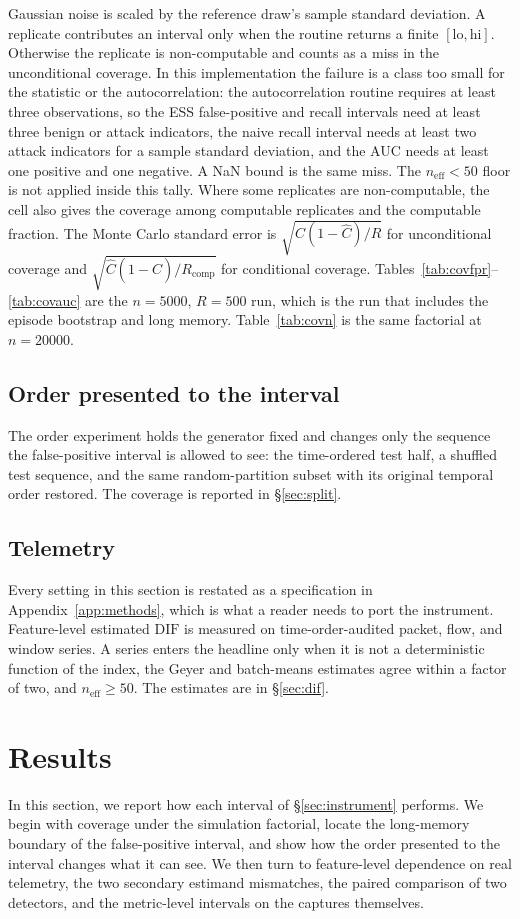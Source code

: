 \documentclass[a4paper,fleqn]{cas-dc}
\newcommand{\DIF}{\mathrm{DIF}}
\newcommand{\neff}{n_{\mathrm{eff}}}
\begin{document}
Gaussian noise is scaled by the reference draw's sample standard deviation. A replicate contributes an interval only when the routine returns a finite
$[\mathrm{lo},\mathrm{hi}]$. Otherwise the replicate is non-computable and counts as a miss in the
unconditional coverage. In this implementation the failure is a class too small for the statistic
or the autocorrelation: the autocorrelation routine requires at least three observations, so the
ESS false-positive and recall intervals need at least three benign or attack indicators, the naive
recall interval needs at least two attack indicators for a sample standard deviation, and the AUC
needs at least one positive and one negative. A NaN bound is the same miss. The $\neff<50$ floor
is not applied inside this tally. Where some replicates are non-computable, the cell also gives
the coverage among computable replicates and the computable fraction. The Monte Carlo standard
error is $\sqrt{\hat C(1-\hat C)/R}$ for unconditional coverage and
$\sqrt{\hat C(1-\hat C)/R_{\mathrm{comp}}}$ for conditional coverage.
Tables~\ref{tab:covfpr}--\ref{tab:covauc} are the $n{=}5000$, $R{=}500$
run, which is the run that includes the episode bootstrap and long memory.
Table~\ref{tab:covn} is the same factorial at $n{=}20000$.

\subsection{Order presented to the interval}
The order experiment holds the generator fixed and changes only the sequence the false-positive
interval is allowed to see: the time-ordered test half, a shuffled test sequence, and the same
random-partition subset with its original temporal order restored. The coverage is reported in
\S\ref{sec:split}.

\subsection{Telemetry}
Every setting in this section is restated as a specification in
Appendix~\ref{app:methods}, which is what a reader needs to port the instrument.
Feature-level estimated $\DIF$ is measured on time-order-audited packet, flow, and window series.
A series enters the headline only when it is not a deterministic function of the index, the Geyer
and batch-means estimates agree within a factor of two, and $\neff\ge50$. The estimates are in
\S\ref{sec:dif}.

\FloatBarrier
\section{Results}\label{sec:results}
In this section, we report how each interval of \S\ref{sec:instrument} performs. We begin with
coverage under the simulation factorial, locate the long-memory boundary of the false-positive
interval, and show how the order presented to the interval changes what it can see. We then turn
to feature-level dependence on real telemetry, the two secondary estimand mismatches, the paired
comparison of two detectors, and the metric-level intervals on the captures themselves.
\end{document}
